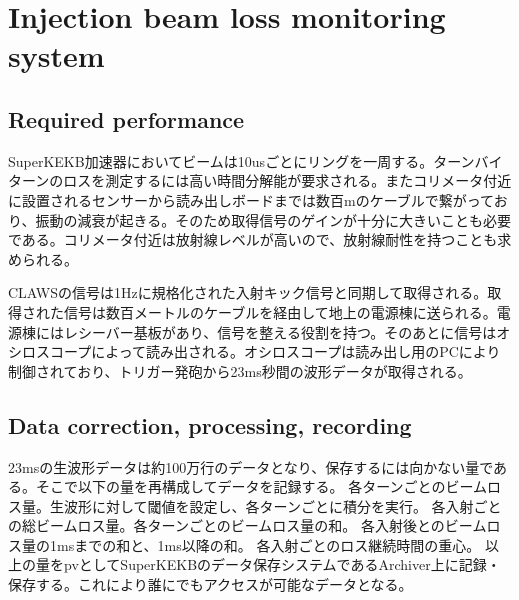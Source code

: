 \chapter{Injection beam loss monitoring system}\label{sec:Injection bea loss monitoring system}

\section{Required performance}
SuperKEKB加速器においてビームは10usごとにリングを一周する。ターンバイターンのロスを測定するには高い時間分解能が要求される。またコリメータ付近に設置されるセンサーから読み出しボードまでは数百mのケーブルで繋がっており、振動の減衰が起きる。そのため取得信号のゲインが十分に大きいことも必要である。コリメータ付近は放射線レベルが高いので、放射線耐性を持つことも求められる。


CLAWSの信号は1Hzに規格化された入射キック信号と同期して取得される。取得された信号は数百メートルのケーブルを経由して地上の電源棟に送られる。電源棟にはレシーバー基板があり、信号を整える役割を持つ。そのあとに信号はオシロスコープによって読み出される。オシロスコープは読み出し用のPCにより制御されており、トリガー発砲から23ms秒間の波形データが取得される。

\section{Data correction, processing, recording}
23msの生波形データは約100万行のデータとなり、保存するには向かない量である。そこで以下の量を再構成してデータを記録する。
各ターンごとのビームロス量。生波形に対して閾値を設定し、各ターンごとに積分を実行。
各入射ごとの総ビームロス量。各ターンごとのビームロス量の和。
各入射後とのビームロス量の1msまでの和と、1ms以降の和。
各入射ごとのロス継続時間の重心。
以上の量をpvとしてSuperKEKBのデータ保存システムであるArchiver上に記録・保存する。これにより誰にでもアクセスが可能なデータとなる。
